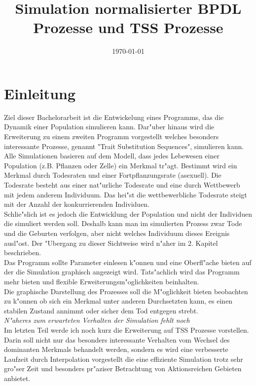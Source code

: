 \documentclass[11pt, a4paper, german]{article}
\date{\today}
\title{Simulation normalisierter BPDL Prozesse und TSS Prozesse}
\theoremstyle{plain}
\begin{document}
\maketitle
\setcounter{tocdepth}{2}
\tableofcontents


\clearpage
\section{Einleitung}
Ziel dieser Bachelorarbeit ist die Entwickelung eines Programms, das die Dynamik einer Population simulieren kann. Dar"uber hinaus wird die Erweiterung zu einem zweiten Programm vorgestellt welches besonders interessante Prozesse, genannt "{}Trait Substitution Sequences"{}, simulieren kann.\\

Alle Simulationen basieren auf dem Modell, dass jedes Lebewesen einer Population (z.B. Pflanzen oder Zelle) ein Merkmal tr"agt. Bestimmt wird ein Merkmal durch Todesraten und einer Fortpflanzungsrate (asexuell). Die Todesrate besteht aus einer nat"urliche Todesrate und eine durch Wettbewerb mit jedem anderem Individuum. Das hei"st die wettbewerbliche Todesrate steigt mit der Anzahl der konkurrierenden Individuen.\\
Schlie"slich ist es jedoch die Entwicklung der Population und nicht der Individuen die simuliert werden soll. Deshalb kann man im simulierten Prozess zwar Tode und die Geburten verfolgen, aber nicht welches Individuum dieses Ereignis ausl"ost. Der "Ubergang zu dieser Sichtweise wird n"aher im 2. Kapitel beschrieben.\\

Das Programm sollte Parameter einlesen k"onnen und eine Oberfl"ache bieten auf der die Simulation graphisch angezeigt wird. Tats"achlich wird das Programm mehr bieten und flexible Erweiterungsm"oglichkeiten beinhalten.\\
Die graphische Darstellung des Prozesses soll die M"oglichkeit bieten beobachten zu k"onnen ob sich ein Merkmal unter anderen Durchsetzten kann, es einen stabilen Zustand annimmt oder sicher dem Tod entgegen strebt.\\
\textit{N"aheres zum erwarteten Verhalten der Simulation fehlt noch}\\

Im letzten Teil werde ich noch kurz die Erweiterung auf TSS Prozesse vorstellen. Darin soll nicht nur das besonders interessante Verhalten vom Wechsel des dominanten Merkmals behandelt werden, sondern es wird eine verbesserte Laufzeit durch Interpolation vorgestellt die eine effiziente Simulation trotz sehr gro"ser Zeit und besonders pr"aziser Betrachtung von Aktionsreichen Gebieten anbietet.
\end{document}
